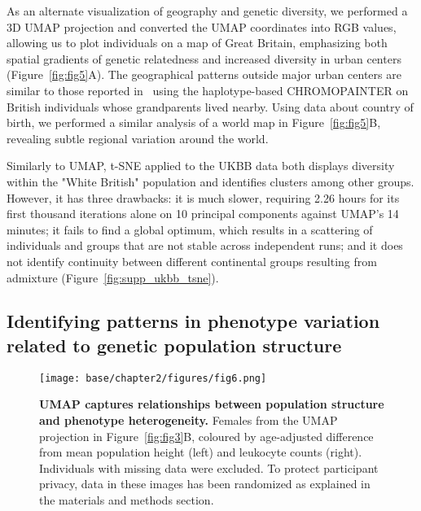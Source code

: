 \clearpage

As an alternate visualization of geography and genetic diversity, we performed a 3D UMAP projection and converted the UMAP coordinates into RGB values, allowing us to plot individuals on a map of Great Britain, emphasizing both spatial gradients of genetic relatedness and increased diversity in urban centers (Figure~\ref{fig:fig5}A). The geographical patterns outside major urban centers are similar to those reported in~\citep{leslie2015fine} using the haplotype-based CHROMOPAINTER on British individuals whose grandparents lived nearby. Using data about country of birth, we performed a similar analysis of a world map in Figure~\ref{fig:fig5}B, revealing subtle regional variation around the world. 

Similarly to UMAP, t-SNE applied to the UKBB data both displays diversity within the "White British" population and identifies clusters among other groups. However, it has three drawbacks: it is much slower, requiring 2.26 hours for its first thousand iterations alone on 10 principal components against UMAP's 14 minutes; it fails to find a global optimum, which results in a scattering of individuals and groups that are not stable across independent runs; and it does not identify continuity between different continental groups resulting from admixture (Figure~\ref{fig:supp_ukbb_tsne}). 

\subsection{Identifying patterns in phenotype variation related to genetic population structure} 

\begin{figure}
    \centering
    \texttt{[image: base/chapter2/figures/fig6.png]}
      \caption[UMAP captures relationships between population structure and phenotype heterogeneity.]{\textbf{UMAP captures relationships between population structure and phenotype heterogeneity.} Females from the UMAP projection in Figure~\ref{fig:fig3}B, coloured by age-adjusted difference from mean population height (left) and leukocyte counts (right). Individuals with missing data were excluded. To protect participant privacy, data in these images has been randomized as explained in the materials and methods section.}
\label{fig:fig6}
\end{figure}

